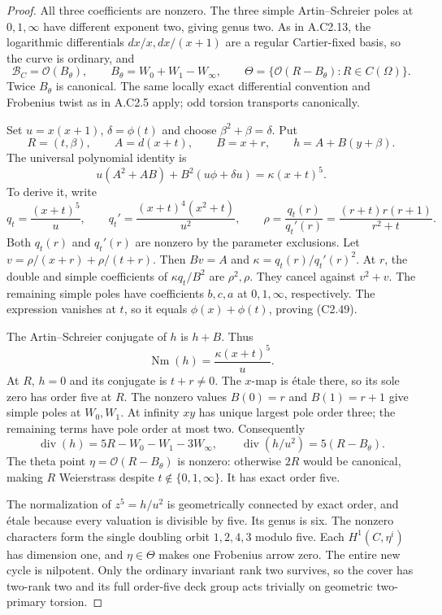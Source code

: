 \begin{proof}
All three coefficients are nonzero. The three simple
Artin--Schreier poles at $0,1,\infty$ have different
exponent two, giving genus two. As in A.C2.13, the
logarithmic differentials $dx/x,dx/(x+1)$ are a regular
Cartier-fixed basis, so the curve is ordinary, and
\[
 \mathcal B_C=\mathcal O(B_\theta),\qquad
 B_\theta=W_0+W_1-W_\infty,\qquad
 \Theta=\{\mathcal O(R-B_\theta):R\in C(\Omega)\}.
\]
Twice $B_\theta$ is canonical. The same locally exact
differential convention and Frobenius twist as in
A.C2.5 apply; odd torsion transports canonically.

Set $u=x(x+1)$, $\delta=\phi(t)$ and choose
$\beta^2+\beta=\delta$. Put
\[
 R=(t,\beta),\qquad A=d(x+t),\qquad B=x+r,\qquad
                          h=A+B(y+\beta).
\]
The universal polynomial identity is
\[
          u(A^2+AB)+B^2(u\phi+\delta u)
                           =\kappa(x+t)^5.                     \tag{C2.49}
\]
To derive it, write
\[
 q_t=\frac{(x+t)^5}{u},\qquad
 q_t'=\frac{(x+t)^4(x^2+t)}{u^2},\qquad
 \rho=\frac{q_t(r)}{q_t'(r)}
      =\frac{(r+t)r(r+1)}{r^2+t}.
\]
Both $q_t(r)$ and $q_t'(r)$ are nonzero by the parameter
exclusions. Let
$v=\rho/(x+r)+\rho/(t+r)$.
Then $Bv=A$ and $\kappa=q_t(r)/q_t'(r)^2$.
At $r$, the double and simple coefficients of
$\kappa q_t/B^2$ are $\rho^2,\rho$.
They cancel against $v^2+v$. The remaining simple
poles have coefficients $b,c,a$ at $0,1,\infty$,
respectively. The expression vanishes at $t$,
so it equals $\phi(x)+\phi(t)$, proving (C2.49).

The Artin--Schreier conjugate of $h$ is $h+B$.
Thus
\[
             \operatorname{Nm}(h)=\frac{\kappa(x+t)^5}{u}.
\]
At $R$, $h=0$ and its conjugate is $t+r\ne0$.
The $x$-map is \'etale there, so its sole zero has
order five at $R$. The nonzero values $B(0)=r$ and
$B(1)=r+1$ give simple poles at $W_0,W_1$.
At infinity $xy$ has unique largest pole order three;
the remaining terms have pole order at most two.
Consequently
\[
 \operatorname{div}(h)=5R-W_0-W_1-3W_\infty,\qquad
 \operatorname{div}(h/u^2)=5(R-B_\theta).                        \tag{C2.50}
\]
The theta point $\eta=\mathcal O(R-B_\theta)$ is
nonzero: otherwise $2R$ would be canonical, making
$R$ Weierstrass despite $t\notin\{0,1,\infty\}$.
It has exact order five.

The normalization of $z^5=h/u^2$ is geometrically
connected by exact order, and \'etale because every
valuation is divisible by five. Its genus is six.
The nonzero characters form the single doubling
orbit $1,2,4,3$ modulo five. Each $H^1(C,\eta^i)$
has dimension one, and $\eta\in\Theta$ makes one
Frobenius arrow zero. The entire new cycle is
nilpotent. Only the ordinary invariant rank two
survives, so the cover has two-rank two and its
full order-five deck group acts trivially on
geometric two-primary torsion.


\end{proof}

